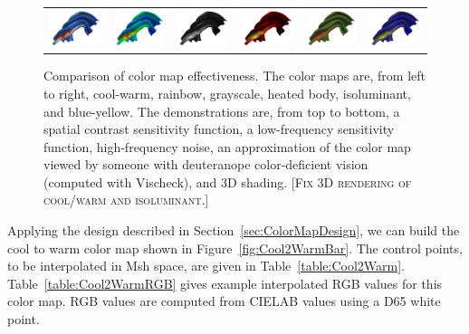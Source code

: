 \documentclass[review,journal]{vgtc}         %
\newcommand{\sticky}[1]{\textsc{[#1]}}
\newcommand{\RGB}{RGB\xspace}
\newcommand{\Lab}{CIELAB\xspace}
\newcommand{\Msh}{Msh\xspace}
\begin{document}
\begin{figure}
\begin{tabular}{c@{\;}c@{\;}c@{\;}c@{\;}c@{\;}c}
    \includegraphics[width=1.1in]{images/Cool2WarmShading} &
    \includegraphics[width=1.1in]{images/RainbowShading} &
    \includegraphics[width=1.1in]{images/GrayscaleShading} &
    \includegraphics[width=1.1in]{images/BlackBodyShading} &
    \includegraphics[width=1.1in]{images/Green2RedShading} &
    \includegraphics[width=1.1in]{images/Blue2YellowShading}
  \end{tabular}
  \caption{Comparison of color map effectiveness.  The color maps are, from
    left to right, cool-warm, rainbow, grayscale, heated body, isoluminant,
    and blue-yellow.  The demonstrations are, from top to bottom, a spatial
    contrast sensitivity function, a low-frequency sensitivity function,
    high-frequency noise, an approximation of the color map viewed by
    someone with deuteranope color-deficient vision (computed with
    Vischeck), and 3D shading.  \sticky{Fix 3D rendering of cool/warm and
      isoluminant.}}
  \label{fig:MapComparison}
\end{figure}

Applying the design described in Section~\ref{sec:ColorMapDesign}, we can
build the cool to warm color map shown in Figure~\ref{fig:Cool2WarmBar}.
The control points, to be interpolated in \Msh space, are given in
Table~\ref{table:Cool2Warm}.  Table~\ref{table:Cool2WarmRGB} gives example
interpolated \RGB values for this color map.  \RGB values are computed from
\Lab values using a D65 white point.
\end{document}
